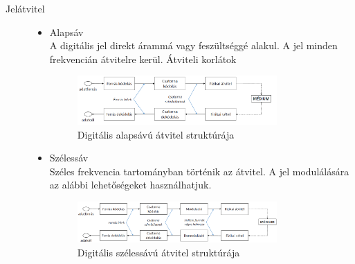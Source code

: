 \documentclass[margin=0px]{article}
\begin{document}
\begin{description}
\begin{description}
\begin{itemize}
                \end{itemize}
        \end{description}
    \item[Jelátvitel] \hfill
        \begin{itemize}
            \item Alapsáv \\
                  A digitális jel direkt árammá vagy feszültséggé alakul. A jel minden frekvencián átvitelre kerül. Átviteli korlátok
                  \begin{figure}[H]
                      \centering
                      \includegraphics[width=0.8\textwidth]{img/alapsav.png}
                      \caption{Digitális alapsávú átvitel struktúrája}
                  \end{figure}
            \item Szélessáv \\
                  Széles frekvencia tartományban történik az átvitel. A jel modulálására az alábbi lehetőségeket használhatjuk.
                  \begin{figure}[H]
                      \centering
                      \includegraphics[width=0.8\textwidth]{img/szelessav.png}
                      \caption{Digitális szélessávú átvitel struktúrája}
                  \end{figure}


\end{itemize}
\end{description}
\end{document}
